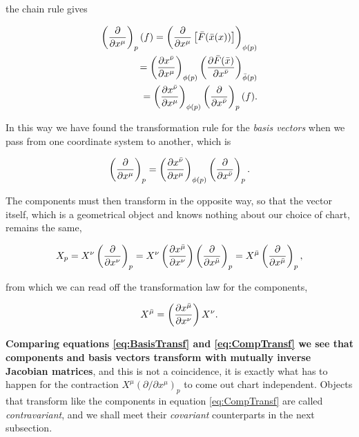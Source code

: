         the chain rule gives

        \begin{align*}
            \left(\frac{\partial}{\partial x^{\mu}}\right)_p(f) = \left(\frac{\partial}{\partial x^{\mu}}\left[\Bar{F}(\Bar{x}(x))\right]\right)_{\phi(p)}\\
            = \left(\frac{\partial x^{\Bar{\nu}}}{\partial x^{\mu}}\right)_{\phi(p)} \left(\frac{\partial \Bar{F}(\Bar{x})}{\partial x^{\Bar{\nu}}}\right)_{\Bar{\phi}(p)}\\
            = \left(\frac{\partial x^{\Bar{\nu}}}{\partial x^{\mu}}\right)_{\phi(p)}\left(\frac{\partial}{\partial x^{\Bar{\nu}}}\right)_p(f).
        \end{align*}

        In this way we have found the transformation rule for the \textit{basis vectors} when we pass from one coordinate system to another, which is

        \begin{equation}\label{eq:BasisTransf}
            \left(\frac{\partial}{\partial x^{\mu}}\right)_p = \left(\frac{\partial x^{\Bar{\nu}}}{\partial x^{\mu}}\right)_{\phi(p)}\left(\frac{\partial}{\partial x^{\Bar{\nu}}}\right)_p.
        \end{equation}

        The components must then transform in the opposite way, so that the vector itself, which is a geometrical object and knows nothing about our choice of chart, remains the same,

        \begin{equation}
            X_p = X^{\nu}\left(\frac{\partial}{\partial x^{\nu}}\right)_p = X^{\nu}\left(\frac{\partial x^{\Bar{\mu}}}{\partial x^{\nu}}\right)\left(\frac{\partial}{\partial x^{\Bar{\mu}}}\right)_p = X^{\Bar{\mu}}\left(\frac{\partial}{\partial x^{\Bar{\mu}}}\right)_p,
        \end{equation}

        from which we can read off the transformation law for the components,

        \begin{equation}\label{eq:CompTransf}
            X^{\Bar{\mu}} = \left(\frac{\partial x^{\Bar{\mu}}}{\partial x^{\nu}}\right)X^{\nu}.
        \end{equation}

        \textbf{Comparing equations \ref{eq:BasisTransf} and \ref{eq:CompTransf} we see that components and basis vectors transform with mutually inverse Jacobian matrices}, and this is not a coincidence, it is exactly what has to happen for the contraction $X^{\mu}(\partial/\partial x^{\mu})_p$ to come out chart independent. Objects that transform like the components in equation \ref{eq:CompTransf} are called \textit{contravariant}, and we shall meet their \textit{covariant} counterparts in the next subsection.

